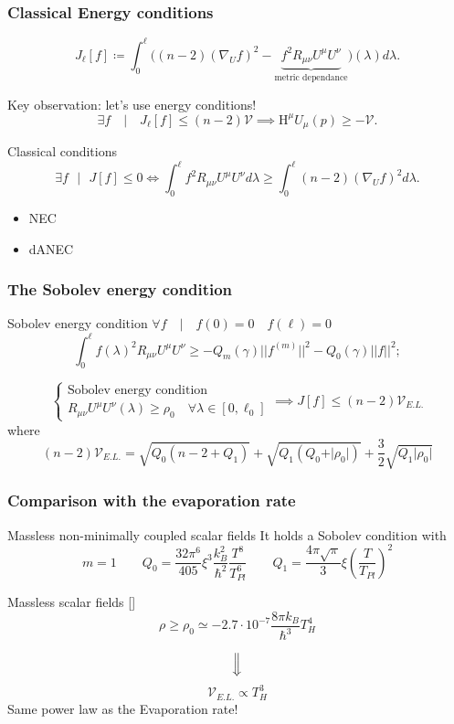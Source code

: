 \documentclass[]{beamer}
\begin{document}
	\begin{frame}
		\frametitle{Classical Energy conditions}
		\[
		J_{\ell}[f] \coloneqq \int_{0}^{\ell} \big((n -2)(\nabla_Uf)^2 - \underbrace{f^2R_{\mu\nu}U^{\mu}U^{\nu}}_{\text{metric dependance}} \big)(\lambda) d\lambda.
		\]
		\begin{ideablock}{Key observation: let's use energy conditions!}
			\[
				\exists f \quad\vert\quad  J_{\ell}[f] \le (n - 2)\mathcal{V} \implies \mathrm{H}^{\mu}U_{\mu}(p) \ge -\mathcal{V}.
			\]
		\end{ideablock}
		\begin{defblock}{Classical conditions}
			 \[
				\exists f \text{ }\vert\text{ } J[f] \le 0 \iff \int_{0}^{\ell}f^2R_{\mu\nu}U^{\mu}U^{\nu}d\lambda \ge \int_{0}^{\ell} (n -2)(\nabla_Uf)^2 d\lambda.
			\] 
		\end{defblock}
		\begin{itemize}
			\item NEC
			\item dANEC
		\end{itemize}

	\end{frame}
	\begin{frame}
		\frametitle{The Sobolev energy condition}
		\begin{defblock}{Sobolev energy condition}
		\(\forall f \quad\vert\quad f(0) = 0 \quad f(\ell) = 0\)
		\[
		\int_0^{\ell} f(\lambda)^2 R_{\mu\nu}U^{\mu}U^{\nu} \ge -Q_m(\gamma) \vert\vert f^{(m)}\vert\vert^2 - Q_0(\gamma) \vert\vert f\vert\vert^2;
		\]
		\end{defblock}
		\[
		\begin{cases}
			\text{Sobolev energy condition} \\
			R_{\mu\nu}U^{\mu}U^{\nu}(\lambda) \ge \rho_0 \quad \forall\lambda\in[0,\ell_0]
		\end{cases}	
		\implies
		J[f] \le (n - 2)\mathcal{V}_{E.L.}
		\]
		where
		\[
			(n - 2)\mathcal{V}_{E.L.} = \sqrt{Q_0(n - 2 + Q_1)} + \sqrt{Q_1(Q_0 + \vert\rho_0\vert)} + \frac{3}{2}\sqrt{Q_1\vert\rho_0\vert}
		\]
	\end{frame}

	\begin{frame}
		\frametitle{Comparison with the evaporation rate}
		\begin{ideablock}{Massless non-minimally coupled scalar fields}
		It holds a Sobolev condition with
		\[
			m = 1\quad\quad
			Q_0 = \frac{32\pi^6}{405}\xi^3 \frac{k_B^2}{\hbar^2}\frac{T^8}{T_{Pl}^6} \quad \quad
			Q_1 = \frac{4\pi\sqrt{\pi}}{3}\xi \left(\frac{T}{T_{Pl}}\right)^2
		\]	
		\end{ideablock}
		\begin{theoblock}{Massless scalar fields [\cite[]{levi2016versatile}]}
			\[
			\rho \ge \rho_0 \simeq -2.7 \cdot 10^{-7} \frac{8\pi k_B}{\hbar^3} T_H^4	
			\]
		\end{theoblock}
		\pause
		\[
		\Big\Downarrow	
		\]
		\[
		\mathcal{V}_{E.L.} \propto T_H^3	
		\]
		\centering
		Same power law as the Evaporation rate!
	\end{frame}
\end{document}
